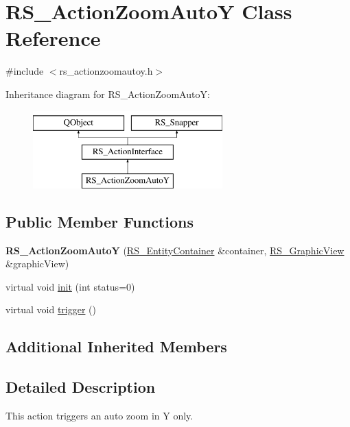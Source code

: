 \hypertarget{classRS__ActionZoomAutoY}{\section{R\-S\-\_\-\-Action\-Zoom\-Auto\-Y Class Reference}
\label{classRS__ActionZoomAutoY}
}


{\ttfamily \#include $<$rs\-\_\-actionzoomautoy.\-h$>$}

Inheritance diagram for R\-S\-\_\-\-Action\-Zoom\-Auto\-Y\-:\begin{figure}[H]
\begin{center}
\leavevmode
\includegraphics[height=3.000000cm]{classRS__ActionZoomAutoY}
\end{center}
\end{figure}
\subsection*{Public Member Functions}
\begin{DoxyCompactItemize}
\item 
\hypertarget{classRS__ActionZoomAutoY_a71163663eeeeba393006c580899cb6b7}{{\bfseries R\-S\-\_\-\-Action\-Zoom\-Auto\-Y} (\hyperlink{classRS__EntityContainer}{R\-S\-\_\-\-Entity\-Container} \&container, \hyperlink{classRS__GraphicView}{R\-S\-\_\-\-Graphic\-View} \&graphic\-View)}\label{classRS__ActionZoomAutoY_a71163663eeeeba393006c580899cb6b7}

\item 
virtual void \hyperlink{classRS__ActionZoomAutoY_aadaabdf00f13feda55ebbf8801ac2751}{init} (int status=0)
\item 
virtual void \hyperlink{classRS__ActionZoomAutoY_a291737c777ac0ef5645a4f054132c134}{trigger} ()
\end{DoxyCompactItemize}
\subsection*{Additional Inherited Members}


\subsection{Detailed Description}
This action triggers an auto zoom in Y only.

